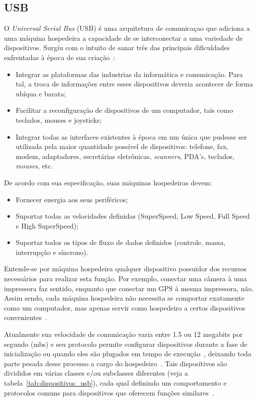 \subsection{USB}

O \emph{Universal Serial Bus} (USB) é uma arquitetura de comunicaçao que adiciona a uma máquina hospedeira a capacidade de se interconectar a uma variedade de dispositivos. Surgiu com o intuito de sanar três das principais dificuldades enfrentadas à época de sua criação~\cite{usbspec}:

\begin{itemize}
	\item Integrar as plataformas das industrias da informática e comunicação. Para tal, a troca de informações entre esses dispositivos deveria acontecer de forma ubíqua e barata;
	\item Facilitar a reconfiguração de dispositivos de um computador, tais como teclados, mouses e joysticks;
	\item Integrar todas as interfaces existentes à época em um única que pudesse ser utilizada pela maior quantidade possível de dispositivos: telefone, fax, modem, adaptadores, secretárias eletrônicas, \emph{scanners}, PDA's, teclados, \emph{mouses}, etc.
\end{itemize}

De acordo com sua especificação, suas máquinas hospedeiras devem:

\begin{itemize}
	\item Fornecer energia aos seus periféricos;
	\item Suportar todas as velocidades definidas (SuperSpeed, Low Speed, Full Speed e High SuperSpeed);
	\item Suportar todos os tipos de fluxo de dados definidos (controle, massa, interrupção e síncrono).
\end{itemize}

Entende-se por máquina hospedeira qualquer dispositivo possuidor dos recursos necessários para realizar esta função. Por exemplo, conectar uma câmera à uma impressora faz sentido, enquanto que conectar um GPS à mesma impressora, não. Assim sendo, cada máquina hospedeira não necessita se comportar exatamente como um computador, mas apenas servir como hospedeiro a certos dispositivos convenientes~\cite{usb3spec}.

Atualmente sua velocidade de comunicação varia entre 1.5 ou 12 megabits por segundo (mbs) e seu protocolo permite configurar dispositivos durante a fase de inicialização ou quando eles são plugados em tempo de execução~\cite{hid}, deixando toda parte pesada desse processo a cargo do hospedeiro~\cite{usb3spec}. Tais dispositivos são divididos em várias classes e/ou subclasses diferentes (veja a tabela~\ref{tab:dispositivos_usb}), cada qual definindo um comportamento e protocolos comuns para dispositivos que oferecem funções similares~\cite{hid}.

